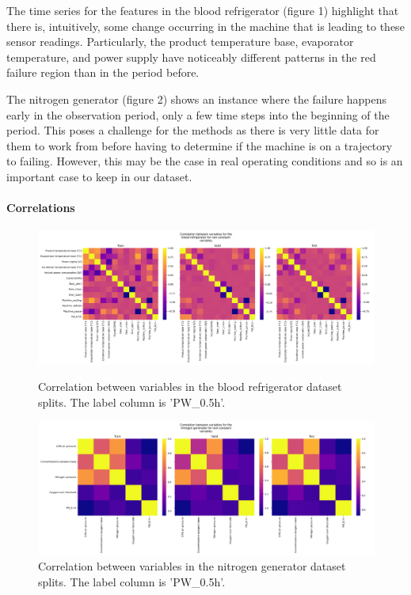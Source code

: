 \documentclass[12pt]{article}
\begin{document}
The time series for the features in the blood refrigerator (figure 1) highlight that there is, intuitively, some change occurring
in the machine that is leading to these sensor readings. Particularly, the product temperature base, evaporator temperature, and power
supply have noticeably different patterns in the red failure region than in the period before.

The nitrogen generator (figure 2) shows an instance where the failure happens early in the observation period, only a few time steps
into the beginning of the period. This poses a challenge for the methods as there is very little data for them to work from before having
to determine if the machine is on a trajectory to failing. However, this may be the case in real operating conditions and so is an
important case to keep in our dataset.

\paragraph{Correlations}

\begin{figure}[h]
    \centering
    \includegraphics[width=16cm]{assets/test/blood-refrigerator/correlations.png}
    \caption{Correlation between variables in the blood refrigerator dataset splits. The label column is 'PW\_0.5h'.}
    \centering
    \includegraphics[width=16cm]{assets/test/nitrogen-generator/correlations.png}
    \caption{Correlation between variables in the nitrogen generator dataset splits. The label column is 'PW\_0.5h'.}
\end{figure}
\end{document}
